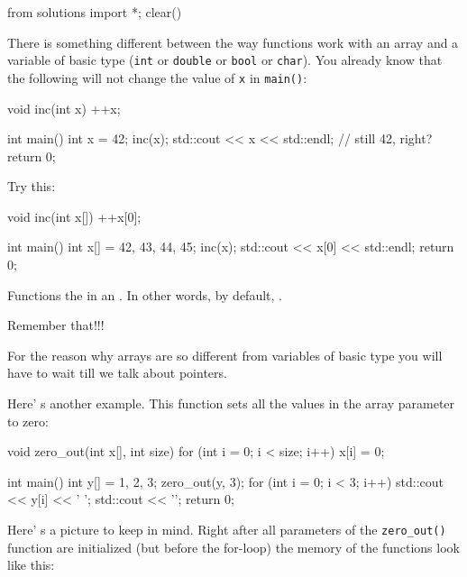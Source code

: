 \begin{python0}
from solutions import *; clear()
\end{python0}

There is something different between the way functions work with an
array and a variable of basic type (\texttt{int} or \texttt{double} or
\texttt{bool} or \texttt{char}). You already know that the following will
not change the value of \texttt{x} in \texttt{main()}:

\begin{consolethree}[escapeinside=||]
void inc(int x)
{
    ++x;
}

int main()
{
    int x = 42;
    inc(x);
    std::cout << x << std::endl; // still 42, right?
    return 0;
}
\end{consolethree}

Try this:

\begin{consolethree}[escapeinside=||]
void inc(int x[])
{
    ++x[0];
}

int main()
{
    int x[] = {42, 43, 44, 45};
    inc(x);
    std::cout << x[0] << std::endl;
    return 0;
}
\end{consolethree}

Functions  the  in an . In other words, by default, .

Remember that!!!

For the reason why arrays are so different from variables of basic type you will have to wait till we talk about pointers.

Here' s another example. This function sets all the values in the array parameter to zero:

\begin{consolethree}[escapeinside=||]
void zero_out(int x[], int size)
{
    for (int i = 0; i < size; i++)
    {
        x[i] = 0;
    }
}

int main()
{
    int y[] = {1, 2, 3};
    zero_out(y, 3);
    for (int i = 0; i < 3; i++)
    {
        std::cout << y[i] << ' ';
    }
    std::cout << '\n';
    return 0;
}
\end{consolethree}

Here' s a picture to keep in mind. Right after all parameters of the \texttt{zero\_out()} function are initialized (but before the for-loop) the memory of the functions look like this:


